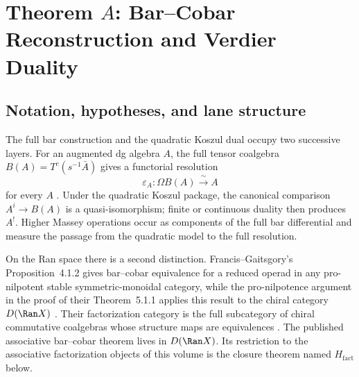 
\providecommand{\Bbarch}{\bar{B}^{\mathrm{ch}}}
\providecommand{\Omegach}{\Omega^{\mathrm{ch}}}
\providecommand{\Kosz}{\mathsf{Kosz}}
\providecommand{\Conil}{\mathsf{Conil}}
\providecommand{\SpCh}{\mathrm{Sp}^{\mathrm{ch}}}
\providecommand{\PhiFA}{\Phi^{\mathrm{FA}}}
\providecommand{\FactOp}{\mathsf{FactOp}}
\providecommand{\FactProp}{\mathsf{FactProp}}
\providecommand{\CoFact}{\mathsf{CoFact}}
\providecommand{\CoFactProp}{\mathsf{CoFactProp}}
\providecommand{\Dmod}{D\text{-}\mathsf{mod}}
\providecommand{\Tc}{\mathrm{T}^{\mathrm c}}
\providecommand{\rel}{\mathrm{rel}}
\providecommand{\PTVV}{\mathrm{PTVV}}
\providecommand{\CY}{\mathrm{CY}}
\providecommand{\Arnold}{\mathrm{Arnold}}

\chapter[Theorem $A$: Bar--Cobar Reconstruction and Verdier Duality]%
{Theorem $A$: Bar--Cobar Reconstruction and Verdier Duality}
\label{ch:theorem-A-infinity-2}\label{chap:theorem-A-infinity-2}

\section*{Notation, hypotheses, and lane structure}

The full bar construction and the quadratic Koszul dual occupy two
successive layers.  For an augmented dg algebra $A$, the full
tensor coalgebra $B(A)=T^c(s^{-1}\bar A)$ gives a functorial
resolution
\[
 \varepsilon_A\colon\Omega B(A)\xrightarrow{\ \sim\ }A
\]
for every $A$ \cite[Corollary~2.3.4]{LV12}.  Under the quadratic
Koszul package, the canonical comparison
$A^i\rightarrow B(A)$ is a quasi-isomorphism; finite or continuous
duality then produces $A^!$.  Higher Massey operations occur as
components of the full bar differential and measure the passage from
the quadratic model to the full resolution.

On the Ran space there is a second distinction.  Francis--Gaitsgory's
Proposition~4.1.2 gives bar--cobar equivalence for a reduced operad in
any pro-nilpotent stable symmetric-monoidal category, while the
pro-nilpotence argument in the proof of their Theorem~5.1.1 applies
this result to the chiral category $D(\Ran X)$
\cite{Francis2012}.
Their factorization category is the full subcategory of chiral
commutative coalgebras whose structure maps are equivalences
\cite[Definition~2.4.7]{Francis2012}.  The published associative
bar--cobar theorem lives in $D(\Ran X)$.  Its restriction to the
associative factorization objects of this volume is the closure theorem
named $H_{\mathrm{fact}}$ below.

